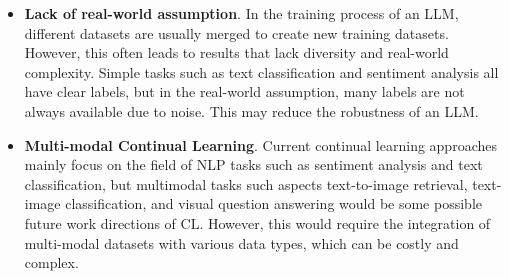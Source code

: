 \documentclass[runningheads]{llncs}
\begin{document}
\begin{itemize}
  \item \textbf{Lack of real-world assumption}. In the training process of an LLM, different datasets are usually merged to create new training datasets. However, this often leads to results that
  lack diversity and real-world complexity. Simple tasks such as text classification and sentiment analysis all have clear labels, but in the real-world assumption, many labels are not always available 
  due to noise. This may reduce the robustness of an LLM.  
  \item \textbf{Multi-modal Continual Learning}. Current continual learning approaches mainly focus on the field of NLP tasks such as sentiment analysis and text classification, but multimodal tasks such aspects
  text-to-image retrieval, text-image classification, and visual question answering would be some possible future work directions of CL. However, this would require the integration of multi-modal datasets with various data types,
  which can be costly and complex. 
\end{itemize} 
\end{document}
